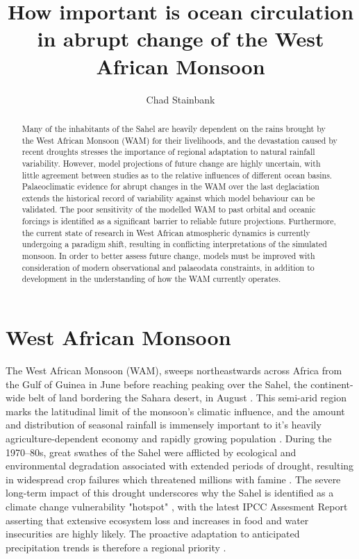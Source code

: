 \documentclass[a4paper]{article}
\begin{document}
\title{How important is ocean circulation in abrupt change of the West African Monsoon}
\author{Chad Stainbank}
\maketitle

\begin{abstract}
    Many of the inhabitants of the Sahel are heavily dependent on the rains brought by the West African Monsoon (WAM) for their livelihoods, and the devastation caused by recent droughts stresses the importance of regional adaptation to natural rainfall variability.
    However, model projections of future change are highly uncertain, with little agreement between studies as to the relative influences of different ocean basins. 
    Palaeoclimatic evidence for abrupt changes in the WAM over the last deglaciation extends the historical record of variability against which model behaviour can be validated.
    The poor sensitivity of the modelled WAM to past orbital and oceanic forcings is identified as a significant barrier to reliable future projections.
    Furthermore, the current state of research in West African atmospheric dynamics is currently undergoing a paradigm shift, resulting in conflicting interpretations of the simulated monsoon.
    In order to better assess future change, models must be improved with consideration of modern observational and palaeodata constraints, in addition to development in the understanding of how the WAM currently operates. 
\end{abstract}

\section*{West African Monsoon}
\label{sec:sahelwam}
The West African Monsoon (WAM), sweeps northeastwards across Africa from the Gulf of Guinea in June before reaching peaking over the Sahel, the continent-wide belt of land bordering the Sahara desert, in August \parencite{sultan2003west2, nicholson2013west}.
This semi-arid region marks the latitudinal limit of the monsoon's climatic influence, and the amount and distribution of seasonal rainfall is immensely important to it's heavily agriculture-dependent economy and rapidly growing population \parencite{sissoko2011agriculture}.
During the 1970--80s, great swathes of the Sahel were afflicted by ecological and environmental degradation associated with extended periods of drought, resulting in widespread crop failures which threatened millions with famine \parencite{benson1998impact, olsson1993causes, walther2016review}.
The severe long-term impact of this drought underscores why the Sahel is identified as a climate change vulnerability "hotspot" \parencite{diffenbaugh2012climate}, with the latest IPCC Assesment Report \parencite{ipcc2014impacts} asserting that extensive ecosystem loss and increases in food and water insecurities are highly likely.
The proactive adaptation to anticipated precipitation trends is therefore a regional priority \parencite{lobell2008prioritizing, sarr2012present}.
\end{document}
